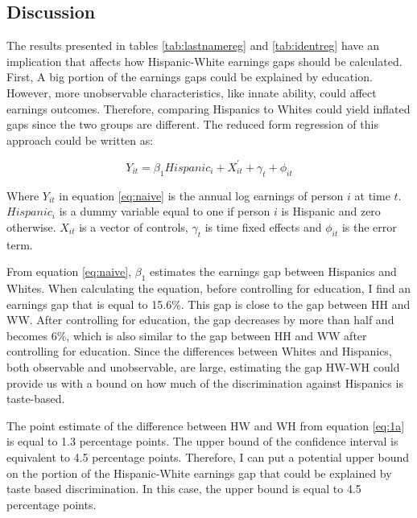\documentclass[12pt, fullpage]{article}
\begin{document}







\subsection{Discussion}
 
 The results presented in tables \ref{tab:lastnamereg} and \ref{tab:identreg} have an implication that affects how Hispanic-White earnings gaps should be calculated. First, A big portion of the earnings gaps could be explained by education. However, more unobservable characteristics, like innate ability, could affect earnings outcomes. Therefore, comparing Hispanics to Whites could yield inflated gaps since the two groups are different. The reduced form regression of this approach could be written as:
 
 \begin{equation} \label{eq:naive}
 Y_{it} = \beta_{1} Hispanic_{i} + X_{it}^{\prime} + \gamma_{t}+\phi_{it}
 \end{equation}
 
 Where $Y_{it}$ in equation \ref{eq:naive} is the annual log earnings of person $i$ at time $t$. $Hispanic_{i}$ is a dummy variable equal to one if person $i$ is Hispanic and zero otherwise. $X_{it}$ is a vector of controls, $\gamma_{t}$ is time fixed effects and $\phi_{it}$ is the error term.
 
 From equation \ref{eq:naive}, $\beta_{1}$ estimates the earnings gap between Hispanics and Whites. When calculating the equation, before controlling for education, I find an earnings gap that is equal to 15.6\%. This gap is close to the gap between HH and WW. After controlling for education, the gap decreases by more than half and becomes 6\%, which is also similar to the gap between HH and WW after controlling for education. Since the differences between Whites and Hispanics, both observable and unobservable, are large, estimating the gap HW-WH could provide us with a bound on how much of the discrimination against Hispanics is taste-based. 
 
The point estimate of the difference between HW and WH from equation \ref{eq:1a} is equal to 1.3 percentage points. The upper bound of the confidence interval is equivalent to 4.5 percentage points. Therefore, I can put a potential upper bound on the portion of the Hispanic-White earnings gap that could be explained by taste based discrimination. In this case, the upper bound is equal to 4.5 percentage points.
\end{document}
